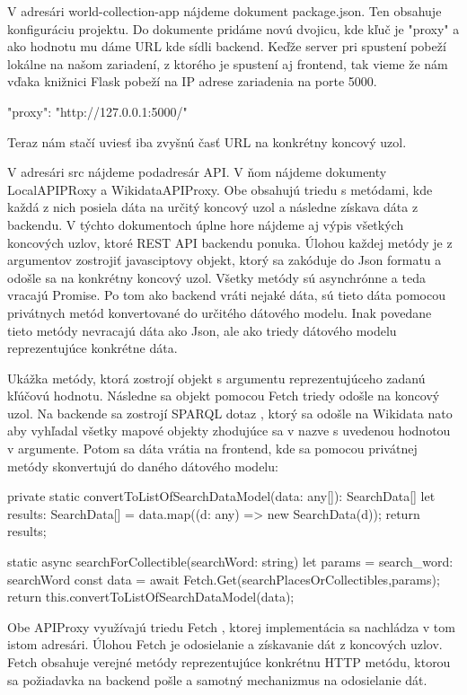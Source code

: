 V adresári world-collection-app nájdeme dokument package.json. Ten obsahuje konfiguráciu projektu. Do dokumente pridáme novú dvojicu, kde kľuč je "proxy" a ako hodnotu mu dáme  
URL kde sídli backend. Keďže server pri spustení pobeží lokálne na našom zariadení, z ktorého je spustení aj frontend, tak vieme že nám vďaka knižnici Flask pobeží na IP adrese zariadenia na porte 5000. 
\begin{code}
        "proxy": "http://127.0.0.1:5000/"
\end{code}
Teraz nám stačí uviesť iba zvyšnú časť URL na konkrétny koncový uzol. 

V adresári src nájdeme podadresár API. V ňom nájdeme dokumenty LocalAPIPRoxy a WikidataAPIProxy. Obe obsahujú triedu s metódami, kde každá z nich posiela dáta na určitý koncový uzol a následne získava dáta z  
backendu. V týchto dokumentoch úplne hore nájdeme aj výpis všetkých koncových uzlov, ktoré REST API backendu ponuka. 
Úlohou každej metódy je z argumentov zostrojiť javasciptovy objekt, ktorý sa zakóduje do Json formatu a odošle sa na konkrétny koncový uzol. Všetky metódy sú asynchrónne a teda vracajú Promise. 
Po tom ako backend vráti nejaké dáta, sú tieto dáta pomocou privátnych metód konvertované do určitého dátového modelu. Inak povedane tieto metódy nevracajú dáta ako Json, ale ako 
triedy dátového modelu reprezentujúce konkrétne dáta. 

Ukážka metódy, ktorá zostrojí objekt s argumentu reprezentujúceho zadanú kľúčovú hodnotu. Následne sa objekt pomocou Fetch triedy odošle na koncový uzol. 
Na backende sa zostrojí SPARQL dotaz , ktorý sa odošle na Wikidata nato aby vyhľadal všetky mapové objekty zhodujúce sa v nazve s uvedenou hodnotou v argumente.
Potom sa dáta vrátia na frontend, kde sa pomocou privátnej metódy skonvertujú do daného dátového modelu: 
\begin{code}
private static convertToListOfSearchDataModel(data: any[]): SearchData[] {
      let results: SearchData[] = data.map((d: any) => new SearchData(d));
      return results;
}

static async searchForCollectible(searchWord: string) {
      let params = {
            search_word: searchWord
      }
      const data = await Fetch.Get(searchPlacesOrCollectibles,params);
      return this.convertToListOfSearchDataModel(data);
}
\end{code}

Obe APIProxy využívajú triedu Fetch , ktorej implementácia sa nachládza v tom istom adresári. Úlohou
Fetch je odosielanie a získavanie dát z koncových uzlov. Fetch obsahuje verejné metódy reprezentujúce 
konkrétnu HTTP metódu, ktorou sa požiadavka na backend pošle a samotný mechanizmus na odosielanie dát. 

